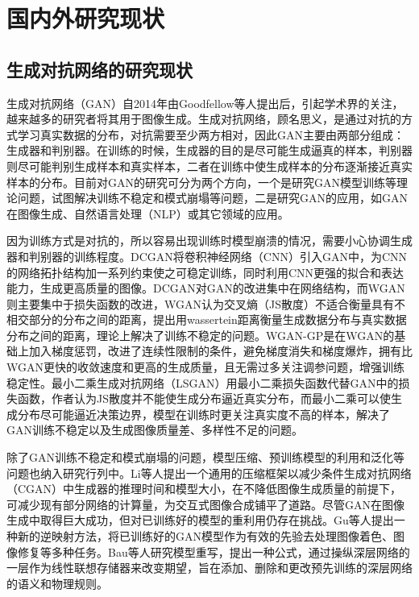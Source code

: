 \section{国内外研究现状}

\subsection{生成对抗网络的研究现状}
生成对抗网络（GAN）\cite{goodfellow2014generative}自2014年由Goodfellow等人提出后，引起学术界的关注，越来越多的研究者将其用于图像生成。生成对抗网络，顾名思义，是通过对抗的方式学习真实数据的分布，对抗需要至少两方相对，因此GAN主要由两部分组成：生成器和判别器。在训练的时候，生成器的目的是尽可能生成逼真的样本，判别器则尽可能判别生成样本和真实样本，二者在训练中使生成样本的分布逐渐接近真实样本的分布。目前对GAN的研究可分为两个方向，一个是研究GAN模型训练等理论问题，试图解决训练不稳定和模式崩塌等问题，二是研究GAN的应用，如GAN在图像生成、自然语言处理（NLP）或其它领域的应用。

因为训练方式是对抗的，所以容易出现训练时模型崩溃的情况，需要小心协调生成器和判别器的训练程度。DCGAN\cite{radford2015unsupervised}将卷积神经网络（CNN）引入GAN中，为CNN的网络拓扑结构加一系列约束使之可稳定训练，同时利用CNN更强的拟合和表达能力，生成更高质量的图像。DCGAN对GAN的改进集中在网络结构，而WGAN\cite{arjovsky2017wasserstein}则主要集中于损失函数的改进，WGAN认为交叉熵（JS散度）不适合衡量具有不相交部分的分布之间的距离，提出用wassertein距离衡量生成数据分布与真实数据分布之间的距离，理论上解决了训练不稳定的问题。WGAN-GP\cite{gulrajani2017improved}是在WGAN的基础上加入梯度惩罚，改进了连续性限制的条件，避免梯度消失和梯度爆炸，拥有比WGAN更快的收敛速度和更高的生成质量，且无需过多关注调参问题，增强训练稳定性。最小二乘生成对抗网络（LSGAN\cite{mao2017least}）用最小二乘损失函数代替GAN中的损失函数，作者认为JS散度并不能使生成分布逼近真实分布，而最小二乘可以使生成分布尽可能逼近决策边界，模型在训练时更关注真实度不高的样本，解决了GAN训练不稳定以及生成图像质量差、多样性不足的问题。

除了GAN训练不稳定和模式崩塌的问题，模型压缩、预训练模型的利用和泛化等问题也纳入研究行列中。Li等人\cite{li2020gan}提出一个通用的压缩框架以减少条件生成对抗网络（CGAN\cite{mirza2014conditional}）中生成器的推理时间和模型大小，在不降低图像生成质量的前提下，可减少现有部分网络的计算量，为交互式图像合成铺平了道路。尽管GAN在图像生成中取得巨大成功，但对已训练好的模型的重利用仍存在挑战。Gu等人\cite{gu2020image}提出一种新的逆映射方法，将已训练好的GAN模型作为有效的先验去处理图像着色、图像修复等多种任务。Bau等人\cite{bau2020rewriting}研究模型重写，提出一种公式，通过操纵深层网络的一层作为线性联想存储器来改变期望，旨在添加、删除和更改预先训练的深层网络的语义和物理规则。

